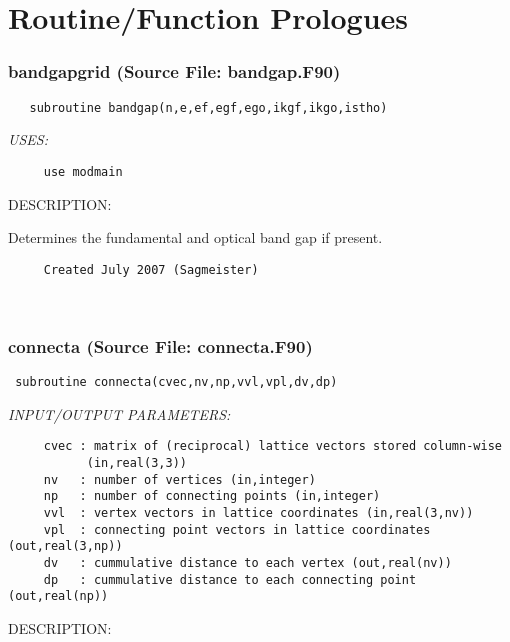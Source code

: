 \documentclass[11pt]{article}
\begin{document}
\tableofcontents
\newpage
\section{Routine/Function Prologues} \label{app:ProLogues}
\subsubsection{bandgapgrid (Source File: bandgap.F90)}


\begin{verbatim}   subroutine bandgap(n,e,ef,egf,ego,ikgf,ikgo,istho)\end{verbatim}{\em USES:}
\begin{verbatim}     use modmain\end{verbatim}
{\sf DESCRIPTION:\\ }


     Determines the fundamental and optical band gap if present.
  
\begin{verbatim}     Created July 2007 (Sagmeister)\end{verbatim}




 
 
\mbox{}\hrulefill\ 
 
\subsubsection{connecta (Source File: connecta.F90)}


\begin{verbatim} subroutine connecta(cvec,nv,np,vvl,vpl,dv,dp)\end{verbatim}{\em INPUT/OUTPUT PARAMETERS:}
\begin{verbatim}     cvec : matrix of (reciprocal) lattice vectors stored column-wise
           (in,real(3,3))
     nv   : number of vertices (in,integer)
     np   : number of connecting points (in,integer)
     vvl  : vertex vectors in lattice coordinates (in,real(3,nv))
     vpl  : connecting point vectors in lattice coordinates (out,real(3,np))
     dv   : cummulative distance to each vertex (out,real(nv))
     dp   : cummulative distance to each connecting point (out,real(np))\end{verbatim}
{\sf DESCRIPTION:\\ }
\end{document}
